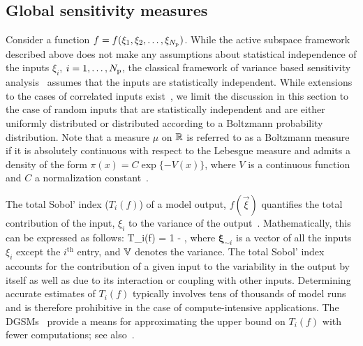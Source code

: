   

\subsection{Global sensitivity measures}

\label{sub:gsa}
Consider a function $f = f(\xi_1, \xi_2, \ldots, \xi_{N_\text{p}})$. 
While the active subspace framework described above does not make any assumptions
about statistical independence of the inputs $\xi_i$, $i = 1, \ldots, {N_\text{p}}$, 
the classical 
framework of variance based sensitivity analysis~\cite{Sobol:2001, Saltelli:2010} 
assumes that the inputs
are statistically independent. While extensions to the cases 
of correlated inputs exist~\cite{Borgonovo:2007,Li:2010,Jacques:2006,Xu:2007,Hart:2017},
 we limit the discussion in this section to the
case of random inputs that are statistically independent and are 
either uniformly distributed or
distributed according to a Boltzmann probability distribution.
Note that a measure $\mu$
on $\mathbb{R}$ is referred to as a Boltzmann measure if it is 
absolutely continuous with respect to the Lebesgue measure  
and admits a density  of the form $\pi(x) = C \exp\{-V(x)\}$,
where $V$ is a continuous function and $C$ a normalization 
constant~\cite{Lamboni:2013}.


The total Sobol' index ($T_i(f)$) of a model output, $f(\vec\xi)$ quantifies
the total contribution of the input, $\xi_i$ to the variance of the
output~\cite{Sobol:2001}. Mathematically, this can be expressed as follows:
%
\be
T_i(f) = 1 - 
,
\label{eq:total}
\ee
%
where $\bm{\xi}_{\sim i}$ is a vector of all the inputs $\xi_i$ except the  $i^\text{th}$ entry, and $\mathbb{V}$ denotes the variance. The total Sobol' index accounts
for the contribution of a given input to the variability in the output by itself
as well as due to its interaction or coupling with other inputs. 
Determining accurate estimates of $T_i(f)$ typically involves tens of
thousands of model runs and is therefore prohibitive in the case of
compute-intensive applications. The DGSMs~\cite{Sobol:2009} provide a means for
approximating the upper bound on $T_i(f)$ with fewer computations; see 
also~\cite{Vohra:2018}. 


